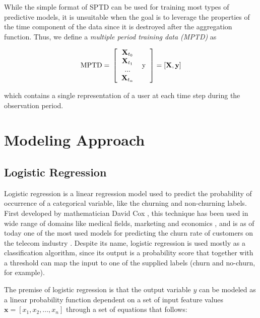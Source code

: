 \documentclass{kththesis}
\begin{document}
While the simple format of SPTD can be used for training most types of predictive models, it is unsuitable when the goal is to leverage the properties of the time component of the data since it is destroyed after the aggregation function. Thus, we define a \emph{multiple period training data (MPTD)} as

\begin{equation}
\text{MPTD} = \\
\left [  
  \begin{tabular}{c c}
   $\mathbf{X}_{t_0}$   & \multirow{4}{*}{y} \\
   $\mathbf{X}_{t_1}$ \\
   ... \\
  $\mathbf{X}_{t_\alpha}$ \\
  \end{tabular}
\right ]
= [\mathbf{X}, \mathbf{y}]
\end{equation}

which contains a single representation of a user at each time step during the observation period.

\section{Modeling Approach}

\subsection{Logistic Regression}

Logistic regression is a linear regression model used to predict the probability of occurrence of a categorical variable, like the churning and non-churning labels. First developed by mathematician David Cox \citep{cox1958regression}, this technique has been used in wide range of domains like medical fields, marketing and economics , and is as of today one of the most used models for predicting the churn rate of customers on the telecom industry \citep{mahajan2015review}. Despite its name, logistic regression is used mostly as a classification algorithm, since its output is a probability score that together with a threshold can map the input to one of the supplied labels (churn and no-churn, for example).

The premise of logistic regression is that the output variable $y$ can be modeled as a linear probability function dependent on a set of input feature values  $\mathbf{x} = [x_1, x_2, ..., x_n]$ through a set of equations that follows:
\end{document}
